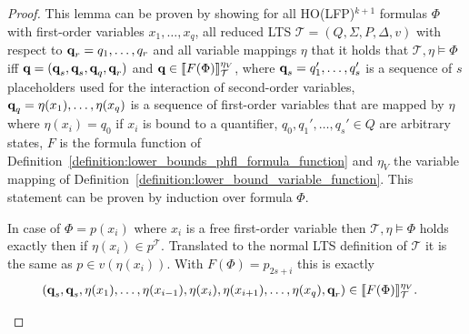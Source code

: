 \begin{proof}
    This lemma can be proven by showing for all HO(LFP)$^{k+1}$ formulas $\Phi$ with first-order variables $x_1,
    \dots, x_q$, all reduced LTS $\mathcal{T} = (Q, \Sigma, P,
    \Delta, v)$ with respect to $\emph{q}_r = q_1, \dots, q_r$ and all variable mappings $\eta$ that it holds that $\mathcal{T}, \eta \models \Phi$ iff $\emph{q} =
    (\emph{q}_s, \emph{q}_s, \emph{q}_q, \emph{q}_r)$ and $\emph{q} \in \llbracket
   F(\Phi)\rrbracket^{\eta_V}_{\mathcal{T}}$, where $\emph{q}_s = q_1',\dots,q_s'$ is a sequence of $s$ placeholders used for the interaction of second-order variables, $\emph{q}_q = \eta(x_1), \dots, \eta(x_q)$ is a sequence of first-order variables that are mapped by $\eta$ where $\eta(x_i) = q_0$ if $x_i$ is bound to a quantifier, $q_0, q_1', \dots, q_s' \in Q$ are arbitrary states, $F$ is the formula function of
    Definition~\ref{definition:lower_bounds_phfl_formula_function} and $\eta_V$ the variable mapping of
    Definition~\ref{definition:lower_bound_variable_function}. This statement can be proven by induction over formula
    $\Phi$.
    \begin{compactitem}
        \item In case of $\Phi = p(x_i)$ where $x_i$ is a free first-order variable then $\mathcal{T}, \eta \models \Phi$ holds exactly then if $\eta(x_i) \in
        p^\mathcal{T}$. Translated to the normal LTS definition of $\mathcal{T}$ it is the same as $p \in v(\eta(x_i))$.
        With $F(\Phi) = p_{2s+i}$ this is exactly
        \begin{align*}
            (\emph{q}_s, \emph{q}_s, \eta(x_1),& \dots, \eta(x_{i-1}), \eta(x_{i}), \eta(x_{i+1}), \dots, \eta(x_q), \emph{q}_r) \in
            \llbracket F(\Phi) \rrbracket^{\eta_V}_\mathcal{T}.
        \end{align*}
        

\end{compactitem}
\end{proof}
